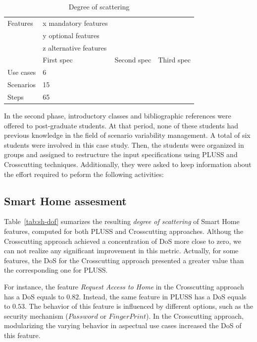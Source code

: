 \documentclass{acm_proc_article-sp}
\begin{document}
\begin{table}[htb]
\centering
\caption{Degree of scattering}
\label{tab:sh-dos}
\begin{small}
\begin{tabular}{llll} \hline
	Features	& x mandatory features 		&  	&\\
			    & y optional features  		&  	&\\
			    & z alternative features 	&	& \\ \hline
			    & First spec & Second spec 	& Third spec  	\\
 	Use cases	& 6			 &				&				\\
	Scenarios   & 15		 &				&				\\
	Steps		& 65		 &				&	 		    \\ \hline
\end{tabular}
\end{small}
\end{table}

In the second phase, introductory classes and bibliographic references were
offered to post-graduate students. At that period, none of these students had
previous knowledge in the field of scenario variability management. A total of six
students were involved in this case study. Then, the students were organized in
groups and assigned to restructure the input specifications using PLUSS and
Crosscutting techniques. Additionally, they were asked to keep information about
the effort required to peform the following activities:

\subsection{Smart Home assesment}

Table~\ref{tab:sh-dof} sumarizes the resulting \emph{degree of scattering} of
Smart Home features, computed for both PLUSS and Crosscutting approaches. Althoug the
Crosscutting approach achieved a concentration of DoS more close to zero, we can
not realize any significant improvement in this metric. Actually, for some
features, the DoS for the Crosscutting approach presented a greater value than
the corresponding one for PLUSS. 

For instance, the feature \emph{Request Access to Home} in the Crosscutting
approach has a DoS equals to $0.82$. Instead, the same feature in PLUSS has a
DoS equals to $0.53$. The behavior of this feature is influenced by different
options, such as the security mechanism ($Password$ or $Finger Print$).
In the Crosscutting approach, modularizing the varying behavior in 
aspectual use cases increased the DoS of this feature. 
\end{document}
